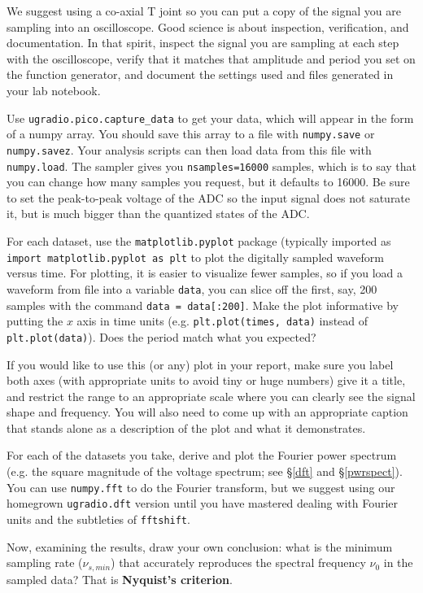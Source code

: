 \documentclass[11pt,preprint]{aastex}
\begin{document}
\noindent We suggest using a co-axial T joint so
you can put a copy of the signal you are sampling into an oscilloscope.
Good science is about inspection, verification, and documentation. In that spirit,
inspect the signal you are sampling at each step with the oscilloscope, verify that it matches that amplitude
and period you set on the function generator, and document the settings used and files generated
in your lab notebook.

Use {\tt ugradio.pico.capture\_data} to get your data, which will appear in the form
of a numpy array.  You should save this array to a file
with {\tt numpy.save} or {\tt numpy.savez}.  Your analysis scripts can then 
load data from this file with {\tt numpy.load}.
The sampler gives you {\tt nsamples=16000} samples, which is to
say that you can change how many samples you request, but it defaults to 16000. 
Be sure to set the
peak-to-peak voltage of the ADC so the input signal does not saturate it, but is much
bigger than the quantized states of the ADC.

For each dataset, use the {\tt matplotlib.pyplot} package (typically imported
as {\tt import matplotlib.pyplot as plt} to plot
the digitally sampled waveform versus
time.  
For plotting, it is easier to visualize fewer samples, so if you load a waveform from file into
a variable {\tt data}, you can slice off the first, say, 200 samples with the command {\tt data = data[:200]}.
Make the plot informative by putting the $x$ axis in time units (e.g. {\tt plt.plot(times, data)} instead of {\tt plt.plot(data)}). 
Does the period match what you expected?

If you would like to use this (or any) plot in your report, make sure you label both axes (with
appropriate units to avoid tiny or huge numbers)
give it a title, and restrict the range to an appropriate scale where you can clearly see
the signal shape and frequency. You will also need to come up with an appropriate caption that
stands alone as a description of the plot and what it demonstrates.

For each of the datasets you take, derive and plot the Fourier power spectrum
(e.g. the square magnitude of the voltage spectrum; see \S\ref{dft} and \S\ref{pwrspect}). You can use {\tt numpy.fft} to do the Fourier
transform, 
but we suggest using our homegrown {\tt ugradio.dft} version until you have mastered dealing with
Fourier units and the subtleties of {\tt fftshift}.

Now, examining the results, draw your own conclusion: what is the
minimum sampling rate ($\nu_{s,min}$) that accurately reproduces the spectral frequency $\nu_0$ in
the sampled data?  That is {\bf Nyquist's criterion}. 
\end{document}
